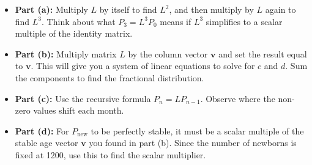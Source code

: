 \begin{hint}
\begin{itemize}
    \item \textbf{Part (a):} Multiply $L$ by itself to find $L^2$, and then multiply by $L$ again to find $L^3$. Think about what $P_3 = L^3 P_0$ means if $L^3$ simplifies to a scalar multiple of the identity matrix.
    \item \textbf{Part (b):} Multiply matrix $L$ by the column vector $\mathbf{v}$ and set the result equal to $\mathbf{v}$. This will give you a system of linear equations to solve for $c$ and $d$. Sum the components to find the fractional distribution.
    \item \textbf{Part (c):} Use the recursive formula $P_n = L P_{n-1}$. Observe where the non-zero values shift each month.
    \item \textbf{Part (d):} For $P_{\text{new}}$ to be perfectly stable, it must be a scalar multiple of the stable age vector $\mathbf{v}$ you found in part (b). Since the number of newborns is fixed at 1200, use this to find the scalar multiplier.
\end{itemize}
\end{hint}

